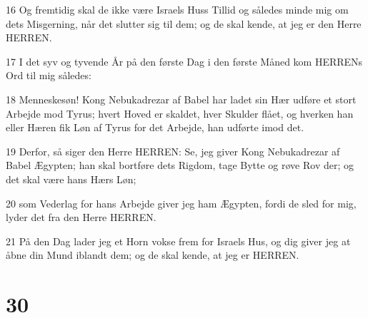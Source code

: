 \par 16 Og fremtidig skal de ikke være Israels Huss Tillid og således minde mig om dets Misgerning, når det slutter sig til dem; og de skal kende, at jeg er den Herre HERREN.
\par 17 I det syv og tyvende År på den første Dag i den første Måned kom HERRENs Ord til mig således:
\par 18 Menneskesøn! Kong Nebukadrezar af Babel har ladet sin Hær udføre et stort Arbejde mod Tyrus; hvert Hoved er skaldet, hver Skulder flået, og hverken han eller Hæren fik Løn af Tyrus for det Arbejde, han udførte imod det.
\par 19 Derfor, så siger den Herre HERREN: Se, jeg giver Kong Nebukadrezar af Babel Ægypten; han skal bortføre dets Rigdom, tage Bytte og røve Rov der; og det skal være hans Hærs Løn;
\par 20 som Vederlag for hans Arbejde giver jeg ham Ægypten, fordi de sled for mig, lyder det fra den Herre HERREN.
\par 21 På den Dag lader jeg et Horn vokse frem for Israels Hus, og dig giver jeg at åbne din Mund iblandt dem; og de skal kende, at jeg er HERREN.

\chapter{30}

